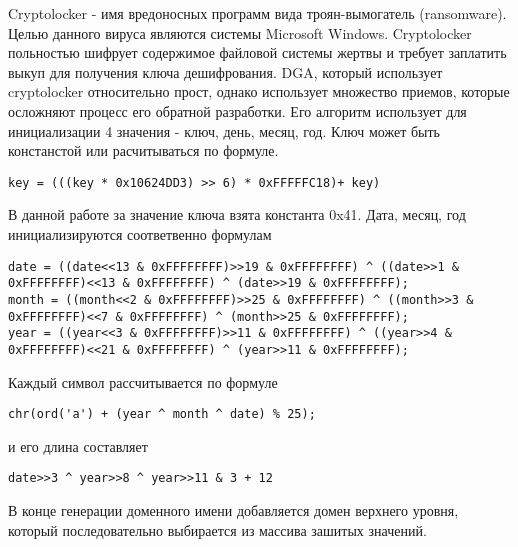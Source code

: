 Cryptolocker - имя вредоносных программ вида троян-вымогатель (ransomware). Целью данного вируса являются системы Microsoft Windows. Cryptolocker польностью шифрует содержимое файловой системы жертвы и требует заплатить выкуп для получения ключа дешифрования.
DGA, который использует cryptolocker относительно прост, однако использует множество приемов, которые осложняют процесс его обратной разработки. Его алгоритм использует для инициализации 4 значения - ключ, день, месяц, год.
Ключ может быть констанстой или расчитываться по формуле.
\begin{lstlisting}
key = (((key * 0x10624DD3) >> 6) * 0xFFFFFC18)+ key)
\end{lstlisting}
В данной работе за значение ключа взята константа 0x41.
Дата, месяц, год инициализируются соответвенно формулам
\begin{lstlisting}
date = ((date<<13 & 0xFFFFFFFF)>>19 & 0xFFFFFFFF) ^ ((date>>1 & 0xFFFFFFFF)<<13 & 0xFFFFFFFF) ^ (date>>19 & 0xFFFFFFFF);
month = ((month<<2 & 0xFFFFFFFF)>>25 & 0xFFFFFFFF) ^ ((month>>3 & 0xFFFFFFFF)<<7 & 0xFFFFFFFF) ^ (month>>25 & 0xFFFFFFFF);
year = ((year<<3 & 0xFFFFFFFF)>>11 & 0xFFFFFFFF) ^ ((year>>4 & 0xFFFFFFFF)<<21 & 0xFFFFFFFF) ^ (year>>11 & 0xFFFFFFFF);
\end{lstlisting}
Каждый символ рассчитывается по формуле
\begin{lstlisting}
chr(ord('a') + (year ^ month ^ date) % 25);
\end{lstlisting}
и его длина составляет
\begin{lstlisting}
date>>3 ^ year>>8 ^ year>>11 & 3 + 12
\end{lstlisting}
В конце генерации доменного имени добавляется домен верхнего уровня, который последовательно выбирается из массива зашитых значений.

